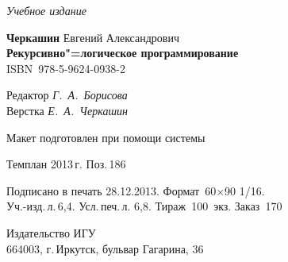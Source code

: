 \documentclass[14pt, openany, twoside, final]{extbook} %
\begin{document}
\vfill\vfill\vfill\vfill

\hfill{}{\small\itshape Учебное издание}
\vspace{4ex}
\begin{center}
{\small\textbf{Черкашин} Евгений Александрович\\[1em]}
{\bfseries Рекурсивно"=логическое программирование}\\[1em]
ISBN~978-5-9624-0938-2
\vfill

\small
Редактор \textit{Г.~А.~Борисова}\\
Верстка \textit{Е.~А.~Черкашин}

\vfill{}
{\small Макет подготовлен при помощи системы \LuaLaTeX\\\mbox{}}
\vfill{}

Темплан 2013\,{}г. Поз.\,{}186

\end{center}
\begin{center}\small
\noindent Подписано в печать 28.12.2013.
Формат~60$\times$90 1/16.\\  %
Уч.-изд.\,{}л.\,{}6,4. Усл.\,{}печ.\,{}л. 6,8. Тираж~100~экз. Заказ~170
\end{center}
\vspace{1           ex}
\begin{center}\small
Издательство ИГУ\\{}
664003, г.\,{}Иркутск, бульвар Гагарина, 36
\end{center}
\end{document}
